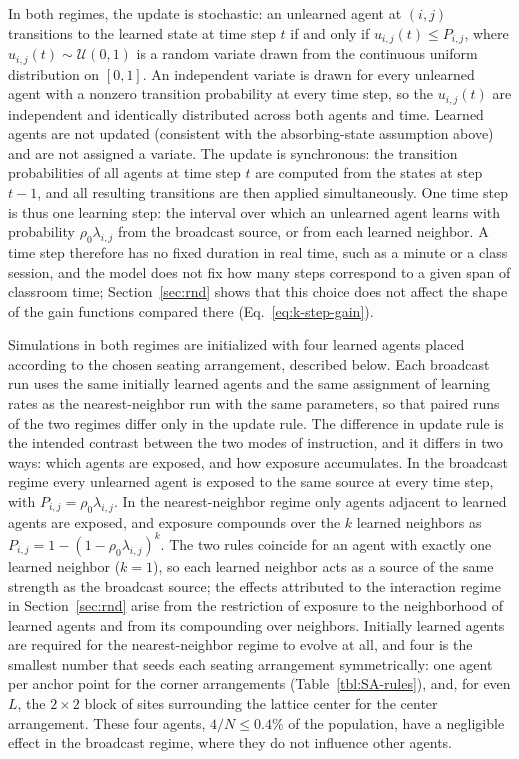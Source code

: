 \documentclass[a4paper,fleqn]{cas-sc}
\begin{document}
In both regimes, the update is stochastic: an unlearned agent at $(i,j)$ transitions to the learned state at time step $t$ if and only if $u_{i,j}(t)\leq P_{i,j}$, where $u_{i,j}(t)\sim\mathcal{U}(0,1)$ is a random variate drawn from the continuous uniform distribution on $[0,1]$. An independent variate is drawn for every unlearned agent with a nonzero transition probability at every time step, so the $u_{i,j}(t)$ are independent and identically distributed across both agents and time. Learned agents are not updated (consistent with the absorbing-state assumption above) and are not assigned a variate.
The update is synchronous: the transition probabilities of all agents at time step $t$ are computed from the states at step $t-1$, and all resulting transitions are then applied simultaneously.
One time step is thus one learning step: the interval over which an unlearned agent learns with probability $\rho_0\lambda_{i,j}$ from the broadcast source, or from each learned neighbor. A time step therefore has no fixed duration in real time, such as a minute or a class session, and the model does not fix how many steps correspond to a given span of classroom time; Section~\ref{sec:rnd} shows that this choice does not affect the shape of the gain functions compared there (Eq.~\eqref{eq:k-step-gain}).

Simulations in both regimes are initialized with four learned agents placed according to the chosen seating arrangement, described below. Each broadcast run uses the same initially learned agents and the same assignment of learning rates as the nearest-neighbor run with the same parameters, so that paired runs of the two regimes differ only in the update rule.
The difference in update rule is the intended contrast between the two modes of instruction, and it differs in two ways: which agents are exposed, and how exposure accumulates.
In the broadcast regime every unlearned agent is exposed to the same source at every time step, with $P_{i,j}=\rho_0\lambda_{i,j}$.
In the nearest-neighbor regime only agents adjacent to learned agents are exposed, and exposure compounds over the $k$ learned neighbors as $P_{i,j}=1-(1-\rho_0\lambda_{i,j})^k$.
The two rules coincide for an agent with exactly one learned neighbor ($k=1$), so each learned neighbor acts as a source of the same strength as the broadcast source; the effects attributed to the interaction regime in Section~\ref{sec:rnd} arise from the restriction of exposure to the neighborhood of learned agents and from its compounding over neighbors.
Initially learned agents are required for the nearest-neighbor regime to evolve at all, and four is the smallest number that seeds each seating arrangement symmetrically: one agent per anchor point for the corner arrangements (Table~\ref{tbl:SA-rules}), and, for even $L$, the $2\times2$ block of sites surrounding the lattice center for the center arrangement.
These four agents, $4/N\leq0.4\%$ of the population, have a negligible effect in the broadcast regime, where they do not influence other agents.
\end{document}
